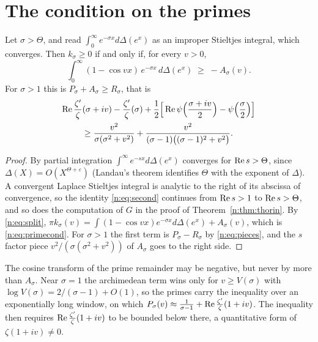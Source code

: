\section{The condition on the primes}\label{n:sec:primes}

\begin{theorem}[proved]\label{n:thm:primes}
Let $\sigma>\Theta$, and read $\int_0^\infty e^{-\sigma x}d\Delta(e^x)$ as an improper Stieltjes integral, which converges. Then $k_\sigma\ge0$ if and only if, for every $v>0$,
\begin{equation}\label{n:eq:primecond}
\int_0^\infty(1-\cos vx)\,e^{-\sigma x}\,d\Delta(e^x)\;\ge\;-A_\sigma(v).
\end{equation}
For $\sigma>1$ this is $P_\sigma+A_\sigma\ge R_\sigma$, that is
\begin{multline}\label{n:eq:primecond2}
\operatorname{Re}\frac{\zeta'}{\zeta}(\sigma+iv)-\frac{\zeta'}{\zeta}(\sigma)+\frac12\Big[\operatorname{Re}\psi\Big(\frac{\sigma+iv}2\Big)-\psi\Big(\frac\sigma2\Big)\Big]\\ \ge\frac{v^2}{\sigma(\sigma^2+v^2)}+\frac{v^2}{(\sigma-1)\big((\sigma-1)^2+v^2\big)} .
\end{multline}
\end{theorem}

\begin{proof}
By partial integration $\int^\infty e^{-sx}d\Delta(e^x)$ converges for $\operatorname{Re} s>\Theta$, since $\Delta(X)=O(X^{\Theta+\varepsilon})$ (Landau's theorem identifies $\Theta$ with the exponent of $\Delta$). A convergent Laplace Stieltjes integral is analytic to the right of its abscissa of convergence, so the identity \eqref{n:eq:second} continues from $\operatorname{Re} s>1$ to $\operatorname{Re} s>\Theta$, and so does the computation of $G$ in the proof of Theorem~\ref{n:thm:thorin}. By \eqref{n:eq:split}, $\pi k_\sigma(v)=\int(1-\cos vx)e^{-\sigma x}d\Delta(e^x)+A_\sigma(v)$, which is \eqref{n:eq:primecond}. For $\sigma>1$ the first term is $P_\sigma-R_\sigma$ by \eqref{n:eq:pieces}, and the $s$ factor piece $v^2/(\sigma(\sigma^2+v^2))$ of $A_\sigma$ goes to the right side.
\end{proof}

The cosine transform of the prime remainder may be negative, but never by more than $A_\sigma$. Near $\sigma=1$ the archimedean term wins only for $v\ge V(\sigma)$ with $\log V(\sigma)=2/(\sigma-1)+O(1)$, so the primes carry the inequality over an exponentially long window, on which $P_\sigma(v)\approx\frac1{\sigma-1}+\operatorname{Re}\frac{\zeta'}{\zeta}(1+iv)$. The inequality then requires $\operatorname{Re}\frac{\zeta'}\zeta(1+iv)$ to be bounded below there, a quantitative form of $\zeta(1+iv)\ne0$.

